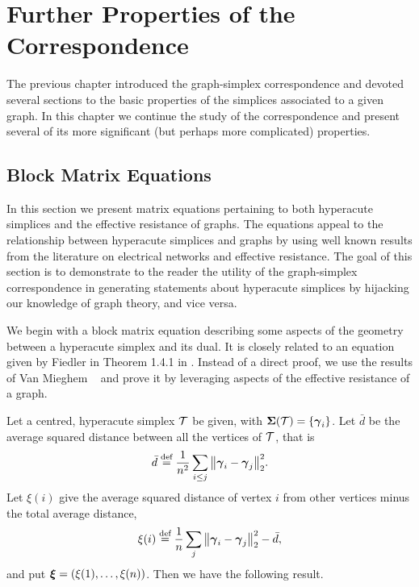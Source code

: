 \chapter{Further Properties of the Correspondence}
\label{chap:further_properties}


The previous chapter introduced the graph-simplex correspondence and devoted several sections to the basic properties of the simplices associated to a given graph. In this chapter we  continue the study of the correspondence and present several of its more significant (but perhaps more complicated) properties.  

\section{Block Matrix Equations}
\label{sec:block_matrix}
In this section we present matrix equations pertaining to both hyperacute simplices and the effective resistance of graphs. The equations appeal to the relationship between hyperacute simplices and graphs by using well known results from the literature on electrical networks and effective resistance. The goal of this section is to demonstrate to the reader the utility of the graph-simplex correspondence in generating statements about hyperacute simplices by hijacking our knowledge of graph theory,  and vice versa. 

We begin with a block matrix equation describing some aspects of  the geometry between a  hyperacute simplex and its dual. It is closely related to an equation given by Fiedler in Theorem 1.4.1 in \cite{fiedler2011matrices}. Instead  of a direct proof, we use the results of Van Mieghem \etal~\cite{van2017pseudoinverse} and prove it by leveraging aspects of the effective resistance of a graph.  

Let a centred, hyperacute simplex $\mathcal{T}$ be given, with $\boldsymbol{\Sigma}(\mathcal{T})=\{\vb*{\gamma}_i\}$.  Let $\bar{d}$ be the average squared distance between all the vertices of $\mathcal{T}$, that is
\begin{equation}
\label{eq:avg_squared_distance}
\bar{d} \overset{\text{def}}{=}  \frac{1}{n^2}\sum_{i\leq j} \norm{\vb*{\gamma}_i-\vb*{\gamma}_j}_2^2.
\end{equation}
Let $\xi(i)$ give the average squared distance of vertex $i$ from other vertices minus the total average distance, 
\begin{equation}
\label{eq:avg_sqd_distance_i}
\xi(i) \overset{\text{def}}{=} \frac{1}{n}\sum_{j} \norm{\vb*{\gamma}_i-\vb*{\gamma}_j}_2^2 - \bar{d},
\end{equation}
and put $\vb*{\xi}=(\xi(1),\dots,\xi(n))$. 
Then we have the following result. 

